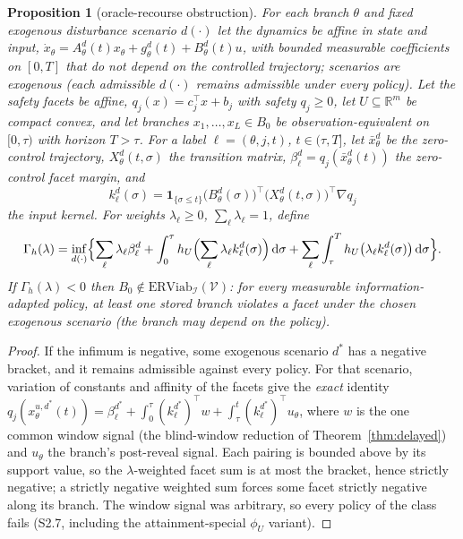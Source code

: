 \documentclass[11pt,a4paper]{article}
\theoremstyle{plain}
\newtheorem{proposition}[theorem]{Proposition}
\theoremstyle{definition}
\theoremstyle{remark}
\newcommand{\R}{\mathbb{R}}
\newcommand{\ERViab}{\mathrm{ERViab}}
\newcommand{\cV}{\mathcal{V}}
\newcommand{\cI}{\mathcal{I}}
\newcommand{\dd}{\,\mathrm{d}}
\begin{document}
\begin{proposition}[oracle-recourse obstruction]\label{prop:recourse}
For each branch $\theta$ and fixed exogenous disturbance scenario $d(\cdot)$ let the dynamics be affine in state and input, $\dot x_\theta=A^d_\theta(t)x_\theta+g^d_\theta(t)+B^d_\theta(t)u$, with bounded measurable coefficients on $[0,T]$ that do not depend on the controlled trajectory; scenarios are exogenous (each admissible $d(\cdot)$ remains admissible under every policy). Let the safety facets be affine, $q_j(x)=c_j^\top x+b_j$ with safety $q_j\ge0$, let $U\subseteq\R^m$ be compact convex, and let branches $x_1,\dots,x_L\in B_0$ be observation-equivalent on $[0,\tau)$ with horizon $T>\tau$. For a label $\ell=(\theta,j,t)$, $t\in(\tau,T]$, let $\bar x^d_\theta$ be the zero-control trajectory, $X^d_\theta(t,\sigma)$ the transition matrix, $\beta^d_\ell=q_j(\bar x^d_\theta(t))$ the zero-control facet margin, and
\[
k^d_\ell(\sigma)=\mathbf 1_{\{\sigma\le t\}}\bigl(B^d_{\theta}(\sigma)\bigr)^\top\bigl(X^d_\theta(t,\sigma)\bigr)^\top\nabla q_j
\]
the input kernel. For weights $\lambda_\ell\ge0$, $\sum_\ell\lambda_\ell=1$, define
\begin{equation}\label{eq:gamma}
\Gamma_h(\lambda)=\inf_{d(\cdot)}\Bigl\{\sum_\ell\lambda_\ell\beta^d_\ell+\int_0^\tau h_U\Bigl(\sum_\ell\lambda_\ell k^d_\ell(\sigma)\Bigr)\dd\sigma+\sum_\ell\int_\tau^Th_U\bigl(\lambda_\ell k^d_\ell(\sigma)\bigr)\dd\sigma\Bigr\}.
\end{equation}
If $\Gamma_h(\lambda)<0$ then $B_0\notin\ERViab_\cI(\cV)$: for every measurable information-adapted policy, at least one stored branch violates a facet under the chosen exogenous scenario (the branch may depend on the policy).
\end{proposition}

\begin{proof}
If the infimum is negative, some exogenous scenario $d^*$ has a negative bracket, and it remains admissible against every policy. For that scenario, variation of constants and affinity of the facets give the \emph{exact} identity $q_j(x^{u,d^*}_\theta(t))=\beta^{d^*}_\ell+\int_0^\tau(k^{d^*}_\ell)^\top w+\int_\tau^t(k^{d^*}_\ell)^\top u_\theta$, where $w$ is the one common window signal (the blind-window reduction of Theorem~\ref{thm:delayed}) and $u_\theta$ the branch's post-reveal signal. Each pairing is bounded above by its support value, so the $\lambda$-weighted facet sum is at most the bracket, hence strictly negative; a strictly negative weighted sum forces some facet strictly negative along its branch. The window signal was arbitrary, so every policy of the class fails (S2.7, including the attainment-special $\phi_U$ variant).
\end{proof}
\end{document}
